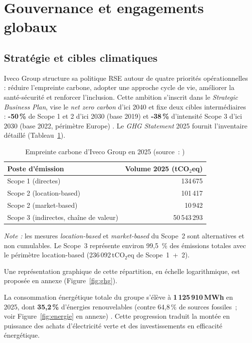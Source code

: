 \section{Gouvernance et engagements globaux}

\subsection{Stratégie et cibles climatiques}

Iveco Group structure sa politique RSE autour de quatre priorités opérationnelles : réduire l'empreinte carbone, adopter une approche cycle de vie, améliorer la santé-sécurité et renforcer l'inclusion. Cette ambition s'inscrit dans le \textit{Strategic Business Plan}, vise le \textit{net zero carbon} d'ici 2040 et fixe deux cibles intermédiaires : \textbf{-50\,\%} de Scope 1 et 2 d'ici 2030 (base 2019) et \textbf{-38\,\%} d'intensité Scope 3 d'ici 2030 (base 2022, périmètre Europe) \cite{iveco_annual_2025,iveco_durabilite_2025}. Le \textit{GHG Statement} 2025 fournit l'inventaire détaillé (Tableau~\ref{tab:ghg}).

\begin{table}[ht]
\centering
\caption[Empreinte carbone d'Iveco Group en 2025]{Empreinte carbone d'Iveco Group en 2025 (source~: \cite{iveco_ghg_2025})}
\label{tab:ghg}
\footnotesize
\begin{tabular}{@{}lr@{}}
\toprule
\textbf{Poste d'émission} & \textbf{Volume 2025 (tCO$_2$eq)} \\
\midrule
Scope 1 (directes) & 134\,675 \\
Scope 2 (location-based) & 101\,417 \\
Scope 2 (market-based) & 10\,942 \\
Scope 3 (indirectes, chaîne de valeur) & 50\,543\,293 \\
\bottomrule
\end{tabular}

\medskip
\textit{Note :} les mesures \textit{location-based} et \textit{market-based} du Scope~2 sont alternatives et non cumulables. Le Scope~3 représente environ 99,5~\% des émissions totales avec le périmètre location-based (236\,092\,tCO$_2$eq de Scope~1~+~2).
\end{table}

Une représentation graphique de cette répartition, en échelle logarithmique, est proposée en annexe (Figure~\ref{fig:ghg}).

La consommation énergétique totale du groupe s'élève à \textbf{1\,125\,910\,MWh} en 2025, dont \textbf{35,2\,\%} d'énergies renouvelables (contre 64,8\,\% de sources fossiles~; voir Figure~\ref{fig:energie} en annexe) \cite{iveco_ghg_2025}. Cette progression traduit la montée en puissance des achats d'électricité verte et des investissements en efficacité énergétique.

